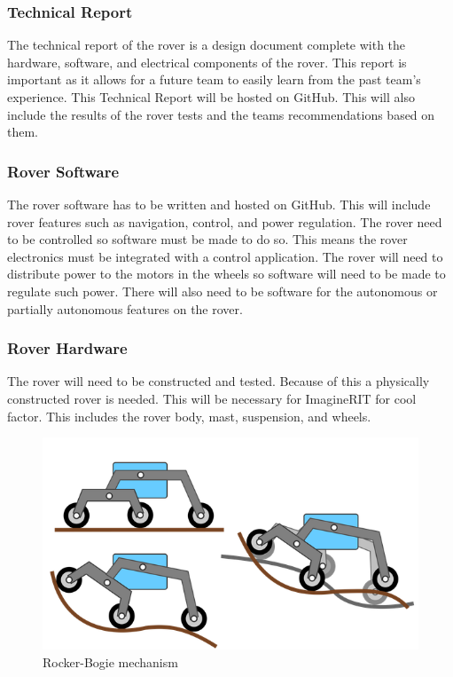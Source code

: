 \documentclass[conference]{IEEEtran} %
\begin{document}
\subsubsection{Technical Report}
\label{techreport}

The technical report of the rover is a design document complete with the hardware, software, and electrical components of the rover. This report is important as it allows for a future team to easily learn from the past team's experience. This Technical Report will be hosted on GitHub. This will also include the results of the rover tests and the teams recommendations  based on them. 

\subsubsection{Rover Software}
\label{roversoftware}
The rover software has to be written and hosted on GitHub. This will include rover features such as navigation, control, and power regulation. The rover need to be controlled so software must be made to do so. This means the rover electronics must be integrated with a control application. The rover will need to distribute power to the motors in the wheels so software will need to be made to regulate such power. There will also need to be software for the autonomous or partially autonomous features on the rover. 

\subsubsection{Rover Hardware}
\label{roverhardware}
The rover will need to be constructed and tested. Because of this a physically constructed rover is needed. This will be necessary for ImagineRIT for cool factor. This includes the rover body, mast, suspension, and wheels. 

\begin{figure}
  \includegraphics[width=\linewidth]{figs/rocker-bogie.png}
  \caption{Rocker-Bogie mechanism}
\label{fig:lifecycle}
\end{figure}
\end{document}

